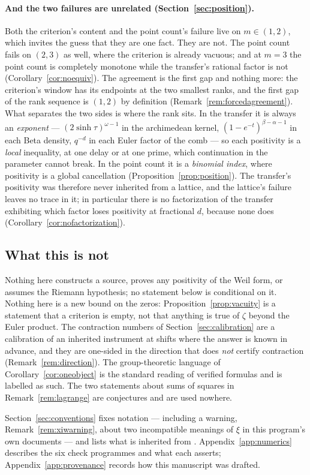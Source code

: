 \paragraph{And the two failures are unrelated (Section~\ref{sec:position}).}
Both the criterion's content and the point count's failure live on $m\in(1,2)$,
which invites the guess that they are one fact. They are not. The point count
fails on $(2,3)$ as well, where the criterion is already vacuous; and at $m=3$
the point count is completely monotone while the transfer's rational factor is
not (Corollary~\ref{cor:noequiv}). The agreement is the first gap and nothing
more: the criterion's window has its endpoints at the two smallest ranks, and the
first gap of the rank sequence is $(1,2)$ by definition
(Remark~\ref{rem:forcedagreement}). What separates the two sides is where the
rank sits. In the transfer it is always an \emph{exponent} ---
$(2\sinh\tau)^{\omega-1}$ in the archimedean kernel,
$(1-e^{-t})^{\beta-\alpha-1}$ in each Beta density, $q^{-d}$ in each Euler factor
of the comb --- so each positivity is a \emph{local} inequality, at one delay or
at one prime, which continuation in the parameter cannot break. In the point
count it is a \emph{binomial index}, where positivity is a global cancellation
(Proposition~\ref{prop:position}). The transfer's positivity was therefore never
inherited from a lattice, and the lattice's failure leaves no trace in it; in
particular there is no factorization of the transfer exhibiting which factor
loses positivity at fractional $d$, because none does
(Corollary~\ref{cor:nofactorization}).

\subsection{What this is not}\label{sec:intro-not}

Nothing here constructs a source, proves any positivity of the Weil form, or
assumes the Riemann hypothesis; no statement below is conditional on it. Nothing
here is a new bound on the zeros: Proposition~\ref{prop:vacuity} is a statement
that a criterion is empty, not that anything is true of $\zeta$ beyond the Euler
product. The contraction numbers of Section~\ref{sec:calibration} are a
calibration of an inherited instrument at shifts where the answer is known in
advance, and they are one-sided in the direction that does \emph{not} certify
contraction (Remark~\ref{rem:direction}). The group-theoretic language of
Corollary~\ref{cor:oneobject} is the standard reading of verified formulas and is
labelled as such. The two statements about sums of squares in
Remark~\ref{rem:lagrange} are conjectures and are used nowhere.

Section~\ref{sec:conventions} fixes notation --- including a warning,
Remark~\ref{rem:xiwarning}, about two incompatible meanings of $\xi$ in this
program's own documents --- and lists what is inherited from \cite{Markov}.
Appendix~\ref{app:numerics} describes the six check programmes and what each
asserts; Appendix~\ref{app:provenance} records how this manuscript was drafted.
